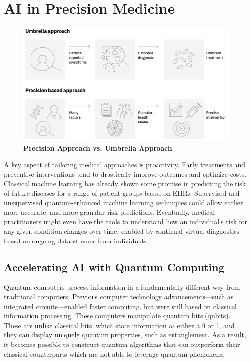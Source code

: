 \documentclass{scrartcl}
\begin{document}
\section{AI in Precision Medicine}
\label{sec:orgee2425f}

\begin{figure}[htbp]
\centering
\includegraphics[width=.9\linewidth]{./assets/precisionMedicineApproach.png}
\caption{\textbf{Precision Approach vs. Umbrella Approach}}
\end{figure}

A key aspect of tailoring medical approaches is proactivity. Early treatments and preventive interventions tend to drastically improve outcomes and optimize costs. Classical machine learning has already shown some promise in predicting the risk of future diseases for a range of patient groups based on EHRs. Supervised and unsupervised quantum-enhanced machine learning techniques could allow earlier more accurate, and more granular risk predictions. Eventually, medical practitioners might even have the tools to understand how an individual’s risk for any given condition changes over time, enabled by continual virtual diagnostics based on ongoing data streams from individuals.

\subsection{Accelerating AI with Quantum Computing}
\label{sec:org7486d72}

Quantum computers process information in a fundamentally different way from traditional computers. Previous computer technology advancements—such as integrated circuits—enabled faster computing, but were still based on classical information processing. These computers manipulate quantum bits (qubits). These are unlike classical bits, which store information as either a 0 or 1, and they can display uniquely quantum properties, such as entanglement. As a result, it becomes possible to construct quantum algorithms that can outperform their classical counterparts which are not able to leverage quantum phenomena.
\end{document}
